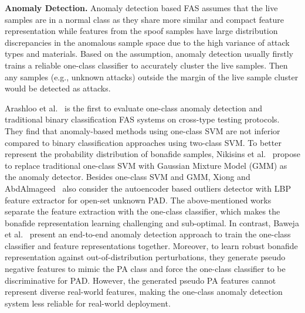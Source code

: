 \documentclass[10pt,journal,compsoc]{IEEEtran}
\begin{document}
\vspace{0.4em}
\noindent\textbf{Anomaly Detection.}\quad   
Anomaly detection based FAS assumes that the live samples are in a normal class as they share more similar and compact feature representation while features from the spoof samples have large distribution discrepancies in the anomalous sample space due to the high variance of attack types and materials. Based on the assumption, anomaly detection usually firstly trains a reliable one-class classifier to accurately cluster the live samples. Then any samples (e.g., unknown attacks) outside the margin of the live sample cluster would be detected as attacks.


Arashloo et al.~\cite{arashloo2017anomaly} is the first to evaluate one-class anomaly detection and traditional binary classification FAS systems on cross-type testing protocols. They find that anomaly-based methods using one-class SVM are not inferior compared to binary classification approaches using two-class SVM. To better represent the probability distribution of bonafide samples, Nikisins et al.~\cite{nikisins2018effectiveness} propose to replace traditional one-class SVM with Gaussian Mixture Model (GMM) as the anomaly detector. Besides one-class SVM and GMM, Xiong and AbdAlmageed~\cite{xiong2018unknown} also consider the autoencoder based outliers detector with LBP feature extractor for open-set unknown PAD. The above-mentioned works separate the feature extraction with the one-class classifier, which makes the bonafide representation learning challenging and sub-optimal. In contrast, Baweja et al.~\cite{baweja2020anomaly} present an end-to-end anomaly detection approach to train the one-class classifier and feature representations together. Moreover, to learn robust bonafide representation against out-of-distribution perturbations, they generate pseudo negative features to mimic the PA class and force the one-class classifier to be discriminative for PAD. However, the generated pseudo PA features cannot represent diverse real-world features, making the one-class anomaly detection system less reliable for real-world deployment.
\end{document}
